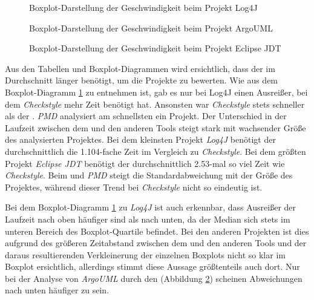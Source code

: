  
 \begin{figure}
    \centering

    \caption{Boxplot-Darstellung der Geschwindigkeit beim Projekt Log4J}
    \label{fig:log4j_box}
\end{figure}

 \begin{figure}
    \centering

    \caption{Boxplot-Darstellung der Geschwindigkeit beim Projekt ArgoUML}
    \label{fig:argo_box}
\end{figure}

 \begin{figure}
    \centering

    \caption{Boxplot-Darstellung der Geschwindigkeit beim Projekt Eclipse JDT }
    \label{fig:eclipse_box}
\end{figure}

Aus den Tabellen und Boxplot-Diagrammen wird ersichtlich, dass der \doceval im Durchschnitt länger benötigt, um die Projekte zu bewerten. Wie aus dem Boxplot-Diagramm \ref{fig:log4j_box} zu entnehmen ist, gab es nur bei Log4J einen Ausreißer, bei dem \textit{Checkstyle} mehr Zeit benötigt hat.   Ansonsten war \textit{Checkstyle} stets schneller als der \doceval. \textit{PMD} analysiert am schnellsten ein Projekt. Der Unterschied in der Laufzeit zwischen dem \doceval und den anderen Tools steigt stark  mit wachsender Größe des analysierten Projektes.  Bei dem kleinsten Projekt \textit{Log4J} benötigt der \doceval  durchschnittlich die 1.104-fache Zeit im Vergleich zu \textit{Checkstyle}. Bei dem größten Projekt \textit{Eclipse JDT} benötigt der \doceval durchschnittlich 2.53-mal so viel Zeit wie \textit{Checkstyle}. Beim \doceval und \textit{PMD} steigt die Standardabweichung mit der Größe des Projektes, während dieser Trend bei \textit{Checkstyle} nicht so eindeutig ist.

Bei dem Boxplot-Diagramm \ref{fig:log4j_box} zu \textit{Log4J} ist auch erkennbar, dass Ausreißer der Laufzeit nach oben häufiger sind als nach unten, da der Median sich stets im unteren Bereich des Boxplot-Quartile befindet. Bei den anderen Projekten ist dies aufgrund des größeren Zeitabstand  zwischen dem \doceval und den anderen Tools  und der daraus resultierenden Verkleinerung der einzelnen Boxplots  nicht so klar im Boxplot ersichtlich, allerdings stimmt diese Aussage größtenteils auch dort. Nur bei der Analyse von \textit{ArgoUML} durch den \doceval (Abbildung \ref{fig:argo_box}) scheinen Abweichungen nach unten häufiger zu sein.

